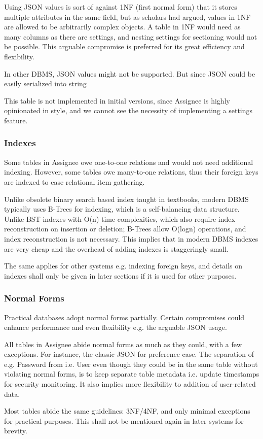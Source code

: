 Using JSON values is sort of against 1NF (first normal form) that it stores multiple
attributes in the same field, but as scholars had argued, values in 1NF are allowed
to be arbitrarily complex objects. A table in 1NF would need as many columns as
there are settings, and nesting settings for sectioning would not be possible.
This arguable compromise is preferred for its great efficiency and flexibility.

\textdagger{} In other DBMS, JSON values might not be supported. But since JSON could
be easily serialized into string

\textdagger{} This table is not implemented in initial versions, since Assignee
is highly opinionated in style, and we cannot see the necessity of implementing a
settings feature.

\subsubsection{Indexes}
\label{data-layer.design.user.indexes}

Some tables in Assignee owe one-to-one relations and would not need additional
indexing. However, some tables owe many-to-one relations, thus their foreign keys
are indexed to ease relational item gathering.

Unlike obsolete binary search based index taught in textbooks, modern DBMS
typically uses B-Trees for indexing, which is a self-balancing data structure.
Unlike BST indexes with O(n) time complexities, which also require index
reconstruction on insertion or deletion; B-Trees allow O(logn) operations, and index
reconstruction is not necessary. This implies that in modern DBMS indexes are
very cheap and the overhead of adding indexes is staggeringly small.

The same applies for other systems e.g. indexing foreign keys, and details on
indexes shall only be given in later sections if it is used for other purposes.

\subsubsection{Normal Forms}
\label{data-layer.design.user.normals}

Practical databases adopt normal forms partially. Certain compromises could
enhance performance and even flexibility e.g. the arguable JSON usage.

All tables in Assignee abide normal forms as much as they could, with a few
exceptions. For instance, the classic JSON for preference case. The separation of
e.g. Password from i.e. User even though they could be in the same table without
violating normal forms, is to keep separate table metadata i.e. update timestamps
for security monitoring. It also implies more flexibility to addition of user-related
data.

Most tables abide the same guidelines: 3NF/4NF, and only minimal exceptions for
practical purposes. This shall not be mentioned again in later systems for brevity.
